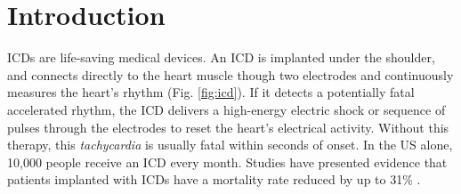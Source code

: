\section{Introduction}
\label{sec:intro}
\acp{ICD} are life-saving medical devices.
An \ac{ICD} is implanted under the shoulder, and connects directly to the heart muscle though two electrodes and continuously measures the heart's rhythm (Fig. \ref{fig:icd}).
If it detects a potentially fatal accelerated rhythm, the \ac{ICD} delivers a high-energy electric shock or sequence of pulses through the electrodes to reset the heart's electrical activity.
Without this therapy, this \emph{tachycardia} is usually fatal within seconds of onset.
In the US alone, 10,000 people receive an \ac{ICD} every month.
Studies have presented evidence that patients implanted with \acp{ICD} have a mortality rate reduced by up to 31\% \cite{maditrit}.

